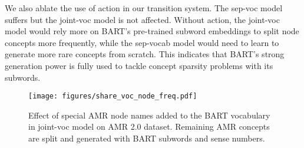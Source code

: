 We also ablate the use of  action in our transition system. The sep-voc model suffers but the joint-voc model is not affected. Without  action, the joint-voc model would rely more on BART's pre-trained subword embeddings to split node concepts more frequently, while the sep-vocab model would need to learn to generate more rare concepts from scratch. This indicates that BART's strong generation power is fully used to tackle concept sparsity problems with its subwords.


\begin{figure}
    \centering
    \texttt{[image: figures/share\_voc\_node\_freq.pdf]}
    \caption{Effect of special AMR node names added to the BART vocabulary in joint-voc model on AMR 2.0 dataset. Remaining AMR concepts are split and generated with BART subwords and sense numbers.}
    \label{fig:voc_min_node}
\end{figure}






\begin{table}[!t]
    \centering
     \caption{Effects of pre-trained BART parameters. Results are with our sep-voc model on AMR 2.0 data.  failed to converge with a range of hyper-parameters.}
    \label{tab:bart_components}
\end{table}


